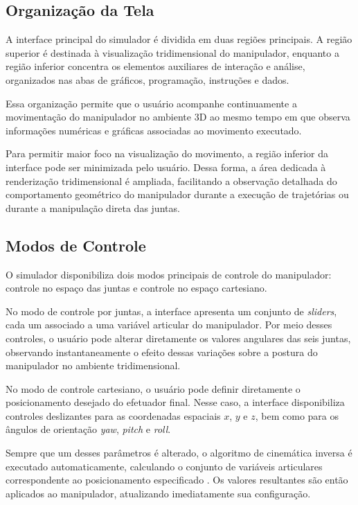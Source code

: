 \subsection{Organização da Tela}

A interface principal do simulador é dividida em duas regiões principais. A região superior é destinada à visualização tridimensional do manipulador, enquanto a região inferior concentra os elementos auxiliares de interação e análise, organizados nas abas de gráficos, programação, instruções e dados.

Essa organização permite que o usuário acompanhe continuamente a movimentação do manipulador no ambiente 3D ao mesmo tempo em que observa informações numéricas e gráficas associadas ao movimento executado.

Para permitir maior foco na visualização do movimento, a região inferior da interface pode ser minimizada pelo usuário. Dessa forma, a área dedicada à renderização tridimensional é ampliada, facilitando a observação detalhada do comportamento geométrico do manipulador durante a execução de trajetórias ou durante a manipulação direta das juntas.

\subsection{Modos de Controle}

O simulador disponibiliza dois modos principais de controle do manipulador: controle no espaço das juntas e controle no espaço cartesiano.

No modo de controle por juntas, a interface apresenta um conjunto de \textit{sliders}, cada um associado a uma variável articular do manipulador. Por meio desses controles, o usuário pode alterar diretamente os valores angulares das seis juntas, observando instantaneamente o efeito dessas variações sobre a postura do manipulador no ambiente tridimensional.

No modo de controle cartesiano, o usuário pode definir diretamente o posicionamento desejado do efetuador final. Nesse caso, a interface disponibiliza controles deslizantes para as coordenadas espaciais $x$, $y$ e $z$, bem como para os ângulos de orientação \textit{yaw}, \textit{pitch} e \textit{roll}. 

Sempre que um desses parâmetros é alterado, o algoritmo de cinemática inversa é executado automaticamente, calculando o conjunto de variáveis articulares correspondente ao posicionamento especificado . Os valores resultantes são então aplicados ao manipulador, atualizando imediatamente sua configuração.

